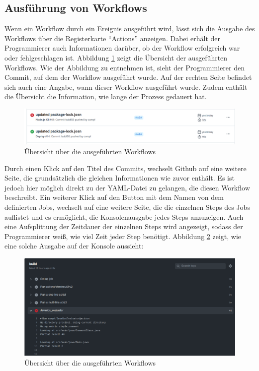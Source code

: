 	\subsection{Ausführung von Workflows}
	Wenn ein Workflow durch ein Ereignis ausgeführt wird, lässt sich die Ausgabe des Workflows über die Registerkarte \enquote{Actions} anzeigen. Dabei erhält der Programmierer auch Informationen darüber, ob der Workflow erfolgreich war oder fehlgeschlagen ist. Abbildung \ref{fig:workflow_overview} zeigt die Übersicht der ausgeführten Workflows. Wie der Abbildung zu entnehmen ist, sieht der Programmierer den Commit, auf dem der Workflow ausgeführt wurde. Auf der rechten Seite befindet sich auch eine Angabe, wann dieser Workflow ausgeführt wurde. Zudem enthält die Übersicht die Information, wie lange der Prozess gedauert hat. 
	\begin{figure}[h]
	    \centering
	    
	    \includegraphics[width=\columnwidth]{figures/workflow_overview.png}
	    \caption{Übersicht über die ausgeführten Workflows}
	    \label{fig:workflow_overview}
	\end{figure}
	
	Durch einen Klick auf den Titel des Commits, wechselt Github auf eine weitere Seite, die grundsätzlich die gleichen Informationen wie zuvor enthält. Es ist jedoch hier möglich direkt zu der YAML-Datei zu gelangen, die diesen Workflow beschreibt. Ein weiterer Klick auf den Button mit dem Namen von dem definierten Jobs, wechselt auf eine weitere Seite, die die einzelnen Steps des Jobs auflistet und es ermöglicht, die Konsolenausgabe jedes Steps anzuzeigen. Auch eine Aufsplittung der Zeitdauer der einzelnen Steps wird angezeigt, sodass der Programmierer weiß, wie viel Zeit jeder Step benötigt. Abbildung \ref{fig:workflow_output} zeigt, wie eine solche Ausgabe auf der Konsole aussieht:
	\begin{figure}[h]
	    \centering
	    
	    \includegraphics[width=\columnwidth]{figures/workflow_output.png}
	    \caption{Übersicht über die ausgeführten Workflows}
	    \label{fig:workflow_output}
	\end{figure}
